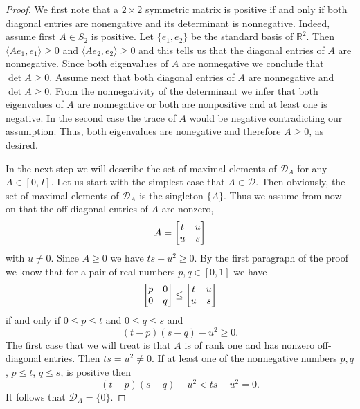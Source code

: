\documentclass{article}
\begin{document}
\begin{proof}
We first note that a $2 \times 2$ symmetric matrix is positive if and only if both diagonal entries are nonengative and its determinant is nonnegative. Indeed, assume first $A \in S_2$ is positive. Let $\{ e_1 , e_2 \}$ be the standard basis of $\mathbb{R}^2$. Then $\langle Ae_1 , e_1 \rangle \ge 0$ and  $\langle Ae_2 , e_2 \rangle \ge 0$ and this tells us that the diagonal entries of $A$ are nonnegative. Since both eigenvalues of $A$ are nonnegative we conclude that $\det A \ge 0$. Assume next that  both diagonal entries of $A$ are nonnegative and $\det A \ge 0$. From the nonnegativity of the determinant we infer that both eigenvalues of $A$ are nonnegative or both are nonpositive and at least one is negative. In the second case the trace of $A$ would be negative contradicting our assumption. Thus, both eigenvalues are nonegative and therefore $A \ge 0$, as desired.

In the next step we will describe the set of maximal elements of $\mathcal{D}_A$ for any $A\in [0,I]$. Let us start with the simplest case that $A \in \mathcal{D}$. Then obviously, the set of maximal elements of $\mathcal{D}_A$ is the singleton $\{ A \}$. Thus we assume from now on that the off-diagonal entries of $A$ are nonzero,
$$
A = \left[ \begin{matrix} t& u \cr u & s \cr \end{matrix} \right] 
$$
with $u \not= 0$. Since $A \ge 0$ we have $ts - u^2 \ge 0$. By the first paragraph of the proof we know that for a pair of real numbers $p,q \in [0,1]$ we have
$$
\left[ \begin{matrix} p& 0 \cr 0 & q \cr \end{matrix} \right] \le \left[ \begin{matrix} t& u \cr u & s \cr \end{matrix} \right]
$$
if and only if $0 \le p \le t$ and $0 \le q \le s$ and 
\begin{equation}\label{detpos}
(t-p)(s-q) - u^2 \ge 0.
\end{equation}
The first case that we will treat is that $A$ is of rank one and has nonzero off-diagonal entries. Then $ts = u^2 \not= 0$. If at least one of the nonnegative numbers $p,q$, $p \le t$, $q \le s$, is positive then
$$
(t-p)(s-q) - u^2 < ts - u^2 = 0 .
$$
It follows that  $\mathcal{D}_A = \{ 0 \}$. 


\end{proof}
\end{document}

